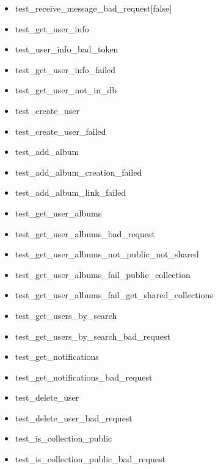 \begin{multicols}{2}
\begin{itemize}
        \item test\_receive\_message\_bad\_request[false]
        \item test\_get\_user\_info
        \item test\_user\_info\_bad\_token
        \item test\_get\_user\_info\_failed
        \item test\_get\_user\_not\_in\_db
        \item test\_create\_user
        \item test\_create\_user\_failed
        \item test\_add\_album
        \item test\_add\_album\_creation\_failed
        \item test\_add\_album\_link\_failed
        \item test\_get\_user\_albums
        \item test\_get\_user\_albums\_bad\_request
        \item test\_get\_user\_albums\_not\_public\_not\_shared
        \item test\_get\_user\_albums\_fail\_public\_collection
        \item test\_get\_user\_albums\_fail\_get\_shared\_collections
        \item test\_get\_users\_by\_search
        \item test\_get\_users\_by\_search\_bad\_request
        \item test\_get\_notifications
        \item test\_get\_notifications\_bad\_request
        \item test\_delete\_user
        \item test\_delete\_user\_bad\_request
        \item test\_is\_collection\_public
        \item test\_is\_collection\_public\_bad\_request
    \end{itemize}
\end{multicols}

